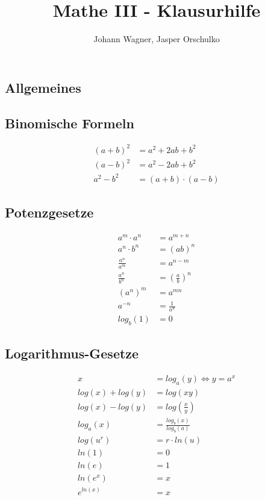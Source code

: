 \documentclass[a4paper, 8pt, landscape]{extarticle}
\author{Johann Wagner, Jasper Orschulko}
\title{Mathe III - Klausurhilfe}
\begin{document}
	\setlength{\abovedisplayskip}{0pt}
	\setlength{\belowdisplayskip}{0pt}
	
    \begin{multicols*}{5}
   	\raggedcolumns
	\section{Allgemeines}
		\subsection{Binomische Formeln}
			\begin{align*}
				(a+b)^{2} &= a^{2}+2ab+b^{2}\\
			    (a-b)^{2} &= a^{2}-2ab+b^{2}\\
			    a^{2}-b^{2} &= (a+b)\cdot(a-b)
			\end{align*}
		\subsection{Potenzgesetze}
			\begin{align*}
	            a^m \cdot a^n &= a^{m+n}\\
	            a^n \cdot b^n &= (ab)^n\\
	            \frac{a^n}{a^m} &= a^{n-m}\\
	            \frac{a^n}{b^n} &= \left(\frac{a}{b}\right)^n\\
	            (a^n)^m &= a^{mn}\\
	            a^{-n} &= \frac{1}{a^n}\\
	            log_b(1) &= 0
            \end{align*}
         \subsection{Logarithmus-Gesetze}
         	\begin{align*}
		         x &= log_a(y) \Leftrightarrow y = a^x\\
		         log(x) + log(y) &= log(xy)\\
		         log(x) - log(y) &= log(\frac{x}{y})\\
		         log_a(x) &= \frac{log_b(x)}{log_b(a)}\\
		         log(u^r) &= r \cdot ln(u)\\
		         ln(1) &= 0\\
		         ln(e) &= 1\\
		         ln(e^x) &= x\\
		         e^{ln(x)} &= x
		    \end{align*}

\end{multicols*}
\end{document}
